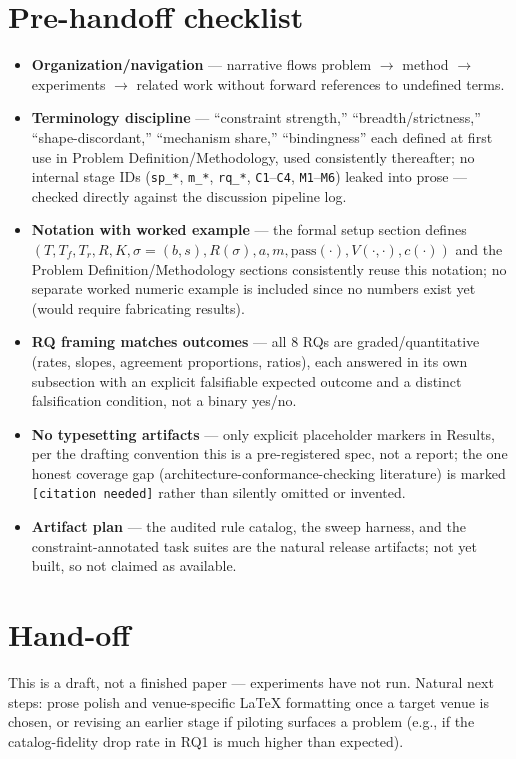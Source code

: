 \documentclass[11pt]{article}
\begin{document}
\section*{Pre-handoff checklist}
\begin{itemize}[leftmargin=1.4em]
\item \textbf{Organization/navigation} --- narrative flows problem $\to$ method $\to$ experiments $\to$ related work without forward references to undefined terms.
\item \textbf{Terminology discipline} --- ``constraint strength,'' ``breadth/strictness,'' ``shape-discordant,'' ``mechanism share,'' ``bindingness'' each defined at first use in Problem Definition/Methodology, used consistently thereafter; no internal stage IDs (\texttt{sp\_*}, \texttt{m\_*}, \texttt{rq\_*}, \texttt{C1}--\texttt{C4}, \texttt{M1}--\texttt{M6}) leaked into prose --- checked directly against the discussion pipeline log.
\item \textbf{Notation with worked example} --- the formal setup section defines $(T, T_f, T_r, R, K, \sigma=(b,s), R(\sigma), a, m, \text{pass}(\cdot), V(\cdot,\cdot), c(\cdot))$ and the Problem Definition/Methodology sections consistently reuse this notation; no separate worked numeric example is included since no numbers exist yet (would require fabricating results).
\item \textbf{RQ framing matches outcomes} --- all 8 RQs are graded/quantitative (rates, slopes, agreement proportions, ratios), each answered in its own subsection with an explicit falsifiable expected outcome and a distinct falsification condition, not a binary yes/no.
\item \textbf{No typesetting artifacts} --- only explicit placeholder markers in Results, per the drafting convention this is a pre-registered spec, not a report; the one honest coverage gap (architecture-conformance-checking literature) is marked \texttt{[citation needed]} rather than silently omitted or invented.
\item \textbf{Artifact plan} --- the audited rule catalog, the sweep harness, and the constraint-annotated task suites are the natural release artifacts; not yet built, so not claimed as available.
\end{itemize}

\section*{Hand-off}
This is a draft, not a finished paper --- experiments have not run. Natural next steps: prose polish and venue-specific LaTeX formatting once a target venue is chosen, or revising an earlier stage if piloting surfaces a problem (e.g., if the catalog-fidelity drop rate in RQ1 is much higher than expected).
\end{document}
